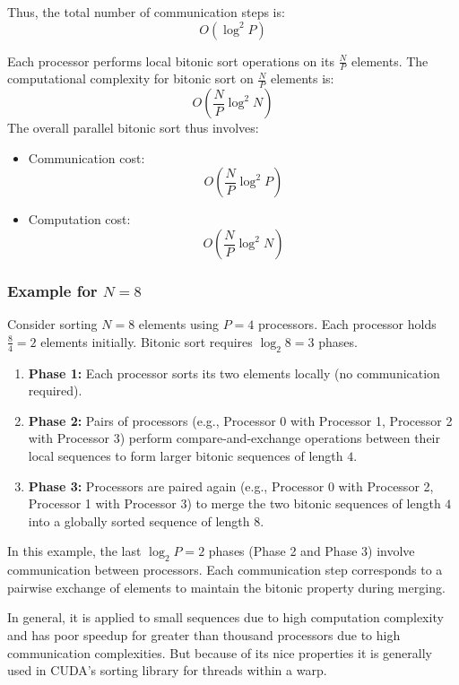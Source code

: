\documentclass[12pt]{book}
\begin{document}
Thus, the total number of communication steps is:
\[
O(\log^2 P)
\]

Each processor performs local bitonic sort operations on its $\frac{N}{P}$ elements. The computational complexity for bitonic sort on $\frac{N}{P}$ elements is:
\[
O\left(\frac{N}{P} \log^2 N\right)
\]
The overall parallel bitonic sort thus involves:
\begin{itemize}
    \item Communication cost: 
    \[
    O\left(\frac{N}{P} \log^2 P\right)
    \]
    \item Computation cost:
    \[
    O\left(\frac{N}{P} \log^2 N\right)
    \]
\end{itemize}

\subsubsection*{Example for $N=8$}

Consider sorting $N = 8$ elements using $P=4$ processors. Each processor holds $\frac{8}{4}=2$ elements initially. Bitonic sort requires $\log_2 8 = 3$ phases.

\begin{enumerate}
    \item \textbf{Phase 1:} Each processor sorts its two elements locally (no communication required).
    \item \textbf{Phase 2:} Pairs of processors (e.g., Processor 0 with Processor 1, Processor 2 with Processor 3) perform compare-and-exchange operations between their local sequences to form larger bitonic sequences of length $4$.
    \item \textbf{Phase 3:} Processors are paired again (e.g., Processor 0 with Processor 2, Processor 1 with Processor 3) to merge the two bitonic sequences of length $4$ into a globally sorted sequence of length $8$.
\end{enumerate}

In this example, the last $\log_2 P = 2$ phases (Phase 2 and Phase 3) involve communication between processors. Each communication step corresponds to a pairwise exchange of elements to maintain the bitonic property during merging.

In general, it is applied to small sequences due to high computation complexity and has poor speedup for greater than thousand processors due to high communication complexities. But because of its nice properties it is generally used in CUDA's sorting library for threads within a warp.
\end{document}
